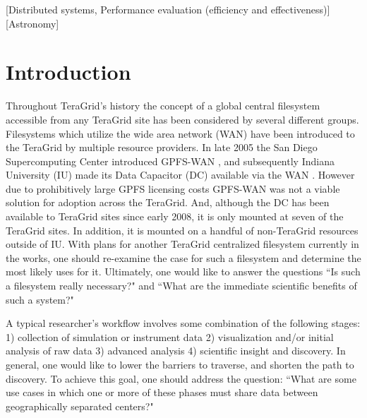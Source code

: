 \documentclass[]{sig-alternate}
\begin{document}
[Distributed systems, Performance evaluation (efficiency and effectiveness)]
[Astronomy]


\vspace{0.25in}
\section{Introduction}\label{sec:intro}
Throughout TeraGrid's history the concept of a global central filesystem accessible from any TeraGrid site has been considered by several different groups. Filesystems which utilize the wide area network (WAN) have been introduced to the TeraGrid by multiple resource providers. In late 2005 the San Diego Supercomputing Center introduced GPFS-WAN \cite{andrews2005}, and subsequently Indiana University (IU) made its Data Capacitor (DC) available via the WAN \cite{dcwan2008}. However due to prohibitively large GPFS licensing costs GPFS-WAN was not a viable solution for adoption across the TeraGrid. And, although the DC has been available to TeraGrid sites since early 2008, it is only mounted at seven of the TeraGrid sites. In addition, it is mounted on a handful of non-TeraGrid resources outside of IU. With plans for another TeraGrid centralized filesystem currently in the works, one should re-examine the case for such a filesystem and determine the most likely uses for it. Ultimately, one would like to answer the questions ``Is such a filesystem really necessary?" and ``What are the immediate scientific benefits of such a system?"  

A typical researcher's workflow involves some combination of the following stages: 1) collection of                simulation or instrument data 2) visualization and/or initial analysis of raw data 3) advanced analysis 4) scientific insight and discovery. In general, one would like to lower the barriers to traverse, and shorten the path to discovery. To achieve this goal, one should address the question: ``What are some use cases in which one or more of these phases must share data between geographically separated centers?"
\end{document}
